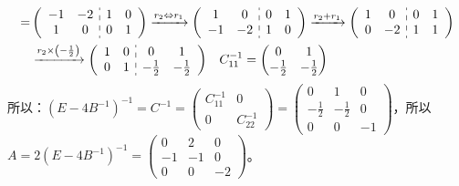 \documentclass[a4paper]{report}
\begin{document}
\begin{jie}
\begin{align*}
[C_{11}|E]=&
\left(
 \begin{array}{c:c}
\begin{matrix}
-1&-2\\
1&0
\end{matrix}&
\begin{matrix}
1&0\\
0&1
\end{matrix}
\end{array}
\right)\xrightarrow{\substack{r_{2}\Leftrightarrow r_{1}}}
{
\left(
 \begin{array}{c:c}
\begin{matrix}
1&0\\
-1&-2
\end{matrix}&
\begin{matrix}
0&1\\
1&0
\end{matrix}
\end{array}
\right)
}\xrightarrow{\substack{r_{2}+ r_{1}}}
{
\left(
 \begin{array}{c:c}
\begin{matrix}
1&0\\
0&-2
\end{matrix}&
\begin{matrix}
0&1\\
1&1
\end{matrix}
\end{array}
\right)
}\\& \xrightarrow{\substack{r_{2}\times\left(-\frac{1}{2}\right)}}
{
\left(
 \begin{array}{c:c}
\begin{matrix}
1&0\\
0&1
\end{matrix}&
\begin{matrix}
0&1\\
-\frac{1}{2}&-\frac{1}{2}
\end{matrix}
\end{array}
\right)
}~~~C_{11}^{-1}=
\begin{pmatrix}
0&1\\
-\frac{1}{2}&-\frac{1}{2}
\end{pmatrix}
\end{align*}
所以：$(E-4B^{-1})^{-1}
=C^{-1}=
\begin{pmatrix}
C_{11}^{-1}&0\\
0&C_{22}^{-1}
\end{pmatrix}=
\begin{pmatrix}
0&1&0\\
-\frac{1}{2}&-\frac{1}{2}&0\\
0&0&-1
\end{pmatrix}
$，所以$A=
2(E-4B^{-1})^{-1}=
\begin{pmatrix}
0&2&0\\
-1&-1&0\\
0&0&-2
\end{pmatrix}
$。
\end{jie}
\end{document}
